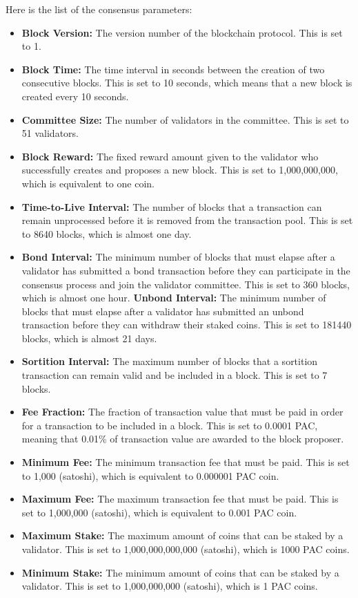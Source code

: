 \documentclass{novel}
\begin{document}
Here is the list of the consensus parameters:
\begin{itemize}
  \item
    \textbf{Block Version:} The version number of the blockchain protocol. This is set to 1.
  \item
    \textbf{Block Time:} The time interval in seconds between the creation of two consecutive blocks. This is set to 10 seconds, which means that a new block is created every 10 seconds.
  \item
    \textbf{Committee Size:} The number of validators in the committee. This is set to 51 validators.
  \item
    \textbf{Block Reward:} The fixed reward amount given to the validator who successfully creates and proposes a new block. This is set to 1,000,000,000, which is equivalent to one coin.
  \item
    \textbf{Time-to-Live Interval:} The number of blocks that a transaction can remain unprocessed before it is removed from the transaction pool. This is set to 8640 blocks, which is almost one day.
  \item
    \textbf{Bond Interval:} The minimum number of blocks that must elapse after a validator has submitted a bond transaction before they can participate in the consensus process and join the validator committee. This is set to 360 blocks, which is almost one hour.
    \textbf{Unbond Interval:} The minimum number of blocks that must elapse after a validator has submitted an unbond transaction before they can withdraw their staked coins. This is set to 181440 blocks, which is almost 21 days.
  \item
    \textbf{Sortition Interval:} The maximum number of blocks that a sortition transaction can remain valid and be included in a block. This is set to 7 blocks.
  \item
    \textbf{Fee Fraction:} The fraction of transaction value that must be paid in order for a transaction to be included in a block. This is set to 0.0001 PAC, meaning that 0.01\% of transaction value are awarded to the block proposer.
  \item
    \textbf{Minimum Fee:} The minimum transaction fee that must be paid. This is set to 1,000 (satoshi), which is equivalent to 0.000001 PAC coin.
  \item
    \textbf{Maximum Fee:} The maximum transaction fee that must be paid. This is set to 1,000,000 (satoshi), which is equivalent to 0.001 PAC coin.
  \item
    \textbf{Maximum Stake:} The maximum amount of coins that can be staked by a validator. This is set to 1,000,000,000,000 (satoshi), which is 1000 PAC coins.
  \item
    \textbf{Minimum Stake:} The minimum amount of coins that can be staked by a validator. This is set to 1,000,000,000 (satoshi), which is 1 PAC coins.
\end{itemize}
\end{document}
